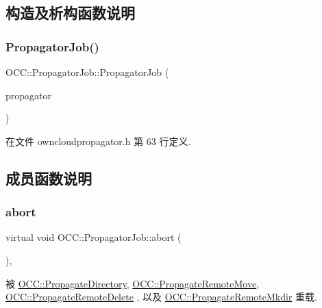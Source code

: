 \subsection{构造及析构函数说明}
\mbox{\label{class_o_c_c_1_1_propagator_job_a360692a84fc7736eb1b9d68d2d265bf7}} 
\subsubsection{\texorpdfstring{Propagator\+Job()}{PropagatorJob()}}
{\footnotesize\ttfamily O\+C\+C\+::\+Propagator\+Job\+::\+Propagator\+Job (\begin{DoxyParamCaption}\item[{\hyperlink{class_o_c_c_1_1_owncloud_propagator}{Owncloud\+Propagator} $\ast$}]{propagator }\end{DoxyParamCaption})\hspace{0.3cm}{\ttfamily [explicit]}}



在文件 owncloudpropagator.\+h 第 63 行定义.



\subsection{成员函数说明}
\mbox{\label{class_o_c_c_1_1_propagator_job_a0d33573c817a705179a87db936b8dcb4}} 
\subsubsection{\texorpdfstring{abort}{abort}}
{\footnotesize\ttfamily virtual void O\+C\+C\+::\+Propagator\+Job\+::abort (\begin{DoxyParamCaption}{ }\end{DoxyParamCaption})\hspace{0.3cm}{\ttfamily [virtual]}, {\ttfamily [slot]}}



被 \hyperlink{class_o_c_c_1_1_propagate_directory_a73fa8d31abcef1d29a1551c438f1568e}{O\+C\+C\+::\+Propagate\+Directory}, \hyperlink{class_o_c_c_1_1_propagate_remote_move_a7d8b531ca627952d2c8b81cd8b14674d}{O\+C\+C\+::\+Propagate\+Remote\+Move}, \hyperlink{class_o_c_c_1_1_propagate_remote_delete_aae847c982bf4a7470799cf905e2357ee}{O\+C\+C\+::\+Propagate\+Remote\+Delete} , 以及 \hyperlink{class_o_c_c_1_1_propagate_remote_mkdir_a9a591f296168a544c7732212647d7ba4}{O\+C\+C\+::\+Propagate\+Remote\+Mkdir} 重载.



